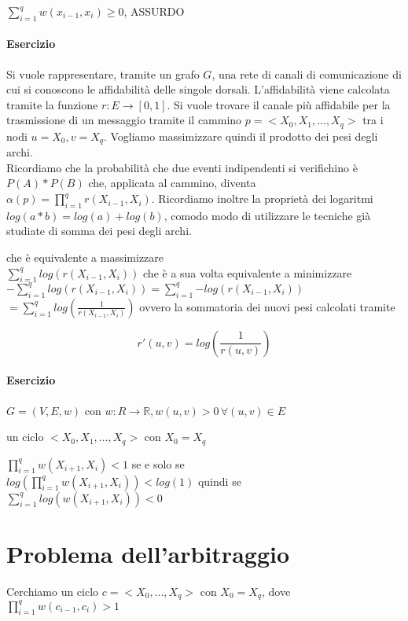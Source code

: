 $\sum_{i=1}^q{w(x_{i-1},x_i)} \geq 0$, ASSURDO


\paragraph{Esercizio}

Si vuole rappresentare, tramite un grafo $G$, una rete di canali di comunicazione di cui si conoscono le affidabilità delle singole dorsali. L'affidabilità viene calcolata tramite la funzione $r : E \rightarrow [0,1]$. Si vuole trovare il canale più affidabile per la trasmissione di un messaggio tramite il cammino $p = <X_0,X_1,\ldots,X_q>$ tra i nodi $u =X_0,v=X_q$. Vogliamo massimizzare quindi il prodotto dei pesi degli archi. \\
Ricordiamo che la probabilità che due eventi indipendenti si verifichino è $P(A) * P(B)$ che, applicata al cammino, diventa $\alpha(p) = \prod_{i=1}^{q}{r(X_{i-1},X_i)}$. Ricordiamo inoltre la proprietà dei logaritmi $log(a*b) = log(a) + log(b)$, comodo modo di utilizzare le tecniche già studiate di somma dei pesi degli archi.


che è equivalente a massimizzare \\
$\sum_{i=1}^q{log(r(X_{i-1},X_i))}$
che è a sua volta equivalente a minimizzare \\
$-\sum_{i=1}^q{log(r(X_{i-1},X_i))} = \sum_{i=1}^q{-log(r(X_{i-1},X_i))}$ \\
$ = \sum_{i=1}^q{log(\frac{1}{r(X_{i-1},X_i)})}$ ovvero la sommatoria dei nuovi pesi calcolati tramite

\begin{equation}
r'(u,v) = log(\frac{1}{r(u,v)})
\end{equation}

\paragraph{Esercizio}

$G=(V,E,w)$ con $w: R \rightarrow \mathbb{R}, w(u,v) >0\,\forall (u,v) \in E$

un ciclo $<X_0,X_1,\ldots,X_q>$ con $X_0 = X_q$

$\prod_{i=1}^q{w(X_{i+1},X_i)} < 1$ se e solo se \\
$log(\prod_{i=1}^q{w(X_{i+1},X_i)}) < log(1)$ quindi se \\
$\sum_{i=1}^q{log(w(X_{i+1},X_i))} < 0$



\section{Problema dell'arbitraggio}
Cerchiamo un ciclo $c = <X_0,\ldots,X_q>$ con $X_0 = X_q$, dove $\prod_{i=1}^q{w(c_{i-1},c_i)} > 1$

